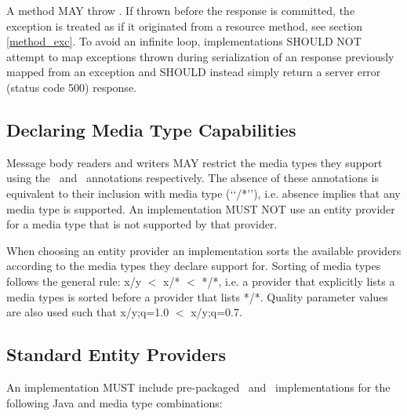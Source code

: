 A \MsgWrite{} method MAY throw \WebAppExc. If thrown before the response is committed, the exception is treated as if it originated from a resource method, see section \ref{method_exc}. To avoid an infinite loop, implementations SHOULD NOT attempt to map exceptions thrown during serialization of an response previously mapped from an exception and SHOULD instead simply return a server error (status code 500) response.

\subsection{Declaring Media Type Capabilities}
\label{declaring_provider_capabilities}

Message body readers and writers MAY restrict the media types they support using the \Consumes\ and \Produces\ annotations respectively. The absence of these annotations is equivalent to their inclusion with media type (\lq\lq*/*\rq\rq), i.e. absence implies that any media type is supported. An implementation MUST NOT use an entity provider for a media type that is not supported by that provider.

When choosing an entity provider an implementation sorts the available providers according to the media types they declare support for. Sorting of media types follows the general rule: x/y $<$ x/* $<$ */*, i.e. a provider that explicitly lists a media types is sorted before a provider that lists */*. Quality parameter values are also used such that x/y;q=1.0 $<$ x/y;q=0.7.

\subsection{Standard Entity Providers}
\label{standard_entity_providers}

An implementation MUST include pre-packaged \MsgRead\ and \MsgWrite\ implementations for the following Java and media type combinations:


